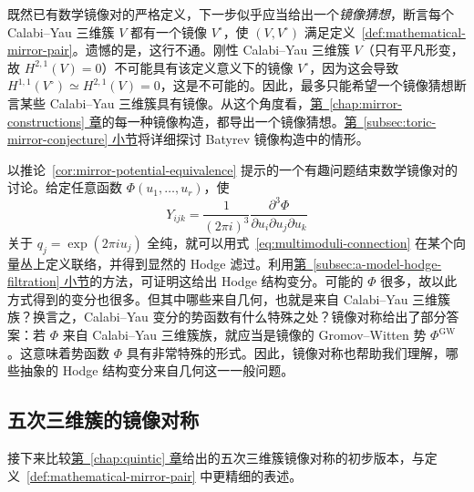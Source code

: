 既然已有数学镜像对的严格定义，下一步似乎应当给出一个\emph{镜像猜想}，断言每个 Calabi--Yau 三维簇 $V$ 都有一个镜像 $V^\circ$，使 $(V,V^\circ)$ 满足定义~\ref{def:mathematical-mirror-pair}。遗憾的是，这行不通。刚性 Calabi--Yau 三维簇 $V$（只有平凡形变，故 $H^{2,1}(V)=0$）不可能具有该定义意义下的镜像 $V^\circ$，因为这会导致 $H^{1,1}(V^\circ)\simeq H^{2,1}(V)=0$，这是不可能的。因此，最多只能希望一个镜像猜想断言某些 Calabi--Yau 三维簇具有镜像。从这个角度看，\hyperref[chap:mirror-constructions]{第~\ref*{chap:mirror-constructions} 章}的每一种镜像构造，都导出一个镜像猜想。\hyperref[subsec:toric-mirror-conjecture]{第~\ref*{subsec:toric-mirror-conjecture} 小节}将详细探讨 Batyrev 镜像构造中的情形。

以推论~\ref{cor:mirror-potential-equivalence} 提示的一个有趣问题结束数学镜像对的讨论。给定任意函数 $\Phi(u_1,\ldots,u_r)$，使
\[
Y_{ijk}=\frac1{(2\pi i)^3}\frac{\partial^3\Phi}{\partial u_i\partial u_j\partial u_k}
\]
关于 $q_j=\exp(2\pi iu_j)$ 全纯，就可以用式~\eqref{eq:multimoduli-connection} 在某个向量丛上定义联络，并得到显然的 Hodge 滤过。利用\hyperref[subsec:a-model-hodge-filtration]{第~\ref*{subsec:a-model-hodge-filtration} 小节}的方法，可证明这给出 Hodge 结构变分。可能的 $\Phi$ 很多，故以此方式得到的变分也很多。但其中哪些来自几何，也就是来自 Calabi--Yau 三维簇族？换言之，Calabi--Yau 变分的势函数有什么特殊之处？镜像对称给出了部分答案：若 $\Phi$ 来自 Calabi--Yau 三维簇族，就应当是镜像的 Gromov--Witten 势
$\Phi^{\mathrm{GW}}$。这意味着势函数 $\Phi$ 具有非常特殊的形式。因此，镜像对称也帮助我们理解，哪些抽象的 Hodge 结构变分来自几何这一一般问题。

\subsection{五次三维簇的镜像对称}\label{subsec:quintic-mirror-symmetry}
接下来比较\hyperref[chap:quintic]{第~\ref*{chap:quintic} 章}给出的五次三维簇镜像对称的初步版本，与定义~\ref{def:mathematical-mirror-pair} 中更精细的表述。

